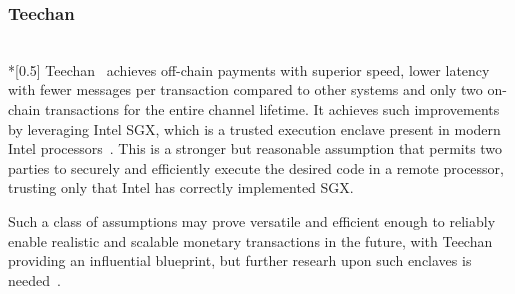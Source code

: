 \subsubsection{Teechan} \ \\*[0.5\baselineskip]
  Teechan~\cite{teechan} achieves off-chain payments with superior speed, lower latency
  with fewer messages per transaction compared to other systems and only two on-chain
  transactions for the entire channel lifetime. It achieves such improvements by
  leveraging Intel SGX, which is a trusted execution enclave present in modern Intel
  processors~\cite{intelsgx}. This is a stronger but reasonable assumption that permits
  two parties to securely and efficiently execute the desired code in a remote processor,
  trusting only that Intel has correctly implemented SGX.

  Such a class of assumptions may prove versatile and efficient enough to reliably enable
  realistic and scalable monetary transactions in the future, with Teechan providing an
  influential blueprint, but further researh upon such enclaves is
  needed~\cite{sgxinsufficient,spectresgx}.

